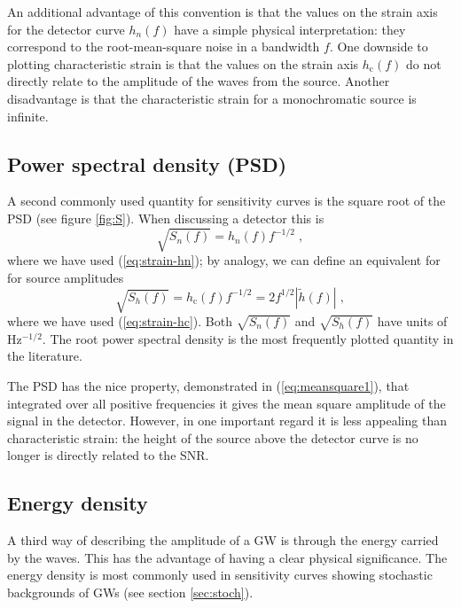 An additional advantage of this convention is that the values on the strain axis for the detector curve $h_n(f)$ have a simple physical interpretation: they correspond to the root-mean-square noise in a bandwidth $f$. One downside to plotting characteristic strain is that the values on the strain axis $h_\mathrm{c}(f)$ do not directly relate to the amplitude of the waves from the source. Another disadvantage is that the characteristic strain for a monochromatic source is infinite.

\subsection{Power spectral density (PSD)}\label{sec:psd}

A second commonly used quantity for sensitivity curves is the square root of the PSD (see figure \ref{fig:S}). When discussing a detector this is
\begin{equation}\label{eq:temp1}
\sqrt{S_{n}(f)} = h_{n}(f)f^{-1/2} \; ,
\end{equation}
where we have used (\ref{eq:strain-hn}); by analogy, we can define an equivalent for for source amplitudes
\begin{equation}
\sqrt{S_{h}(f)} = h_\mathrm{c}(f)f^{-1/2} = 2 f^{1/2} \left| \tilde{h}(f) \right| \; ,
\label{eq:ShforSources}
\end{equation}
where we have used (\ref{eq:strain-hc}). Both $\sqrt{S_{n}(f)}$ and $\sqrt{S_{h}(f)}$ have units of $\mathrm{Hz^{-1/2}}$. The root power spectral density is the most frequently plotted quantity in the literature.

The PSD has the nice property, demonstrated in (\ref{eq:meansquare1}), that integrated over all positive frequencies it gives the mean square amplitude of the signal in the detector. However, in one important regard it is less appealing than characteristic strain: the height of the source above the detector curve is no longer is directly related to the SNR.


\subsection{Energy density}\label{sec:energy-density}

A third way of describing the amplitude of a GW is through the energy carried by the waves. This has the advantage of having a clear physical significance. The energy density is most commonly used in sensitivity curves showing stochastic backgrounds of GWs (see section \ref{sec:stoch}).

